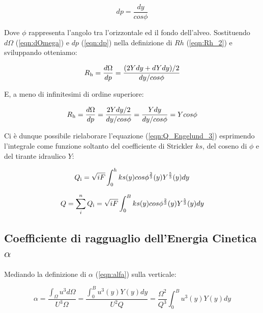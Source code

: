 \documentclass[12pt]{article} %
\begin{document}
\begin{equation}
    dp=\frac{dy}{cos\phi}
    \label{eqn:dp}
\end{equation}

\noindent Dove $\phi$ rappresenta l’angolo tra l’orizzontale ed il fondo dell’alveo. Sostituendo $d\Omega$ (\ref{eqn:dOmega}) e $dp$ (\ref{eqn:dp}) nella definizione di $Rh$ (\ref{eqn:Rh_2}) e sviluppando otteniamo:

\begin{equation}
    R\textsubscript{h}=\frac{d\Omega}{dp}=\frac{(2Ydy+dYdy)/2}{dy/cos\phi}
    \label{eqn:Rh_3}
\end{equation}

\noindent E, a meno di infinitesimi di ordine superiore:

\begin{equation}
    R\textsubscript{h}=\frac{d\Omega}{dp}=\frac{2Ydy/2}{dy/cos\phi}=\frac{Ydy}{dy/cos\phi}=Ycos\phi
    \label{eqn:Rh_4}
\end{equation}

\noindent Ci è dunque possibile rielaborare l’equazione (\ref{eqn:Q_Engelund_3}) esprimendo l’integrale come funzione soltanto del coefficiente di Strickler $ks$, del coseno di $\phi$ e del tirante idraulico $Y$:

\begin{equation}
    Q\textsubscript{i}=\sqrt{iF}\int_{0}^{h} ks(y)cos\phi^{\frac{2}{3}}(y)Y^{\frac{5}{3}}(y)dy
    \label{eqn:Q_Engelund_4}
\end{equation}

\begin{equation}
   Q=\sum_i^n Q\textsubscript{i}=\sqrt{iF}\int_{0}^{B} ks(y)cos\phi^{\frac{2}{3}}(y)Y^{\frac{5}{3}}(y)dy
    \label{eqn:Q_Engelund_5}
\end{equation}

\subsection{\texorpdfstring{Coefficiente di ragguaglio dell’Energia Cinetica $\alpha$}{}}

\noindent Mediando la definizione di $\alpha$ (\ref{eqn:alfa}) sulla verticale:

\begin{equation}
    \alpha=\frac{\int_{\Omega}^{} u^{3}d\Omega}{U^{3}\Omega}=\frac{\int_{0}^{B} u^{3}(y)Y(y)dy}{U^{2}Q}=\frac{\Omega^{2}}{Q^{3}}\int_{0}^{B}u^{3}(y)Y(y)dy
    \label{eqn:alfa_Engelund_1}
\end{equation}
\end{document}

